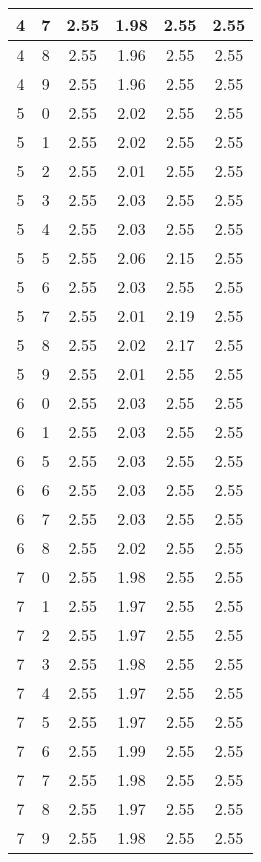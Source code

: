 \begin{longtable}{|c|c||c||c|c||c|}
	4 & 7 & 2.55 & 1.98 & 2.55 & 2.55 \\ \hline
	4 & 8 & 2.55 & 1.96 & 2.55 & 2.55 \\ \hline
	4 & 9 & 2.55 & 1.96 & 2.55 & 2.55 \\ \hline
	5 & 0 & 2.55 & 2.02 & 2.55 & 2.55 \\ \hline
	5 & 1 & 2.55 & 2.02 & 2.55 & 2.55 \\ \hline
	5 & 2 & 2.55 & 2.01 & 2.55 & 2.55 \\ \hline
	5 & 3 & 2.55 & 2.03 & 2.55 & 2.55 \\ \hline
	5 & 4 & 2.55 & 2.03 & 2.55 & 2.55 \\ \hline
	5 & 5 & 2.55 & 2.06 & 2.15 & 2.55 \\ \hline
	5 & 6 & 2.55 & 2.03 & 2.55 & 2.55 \\ \hline
	5 & 7 & 2.55 & 2.01 & 2.19 & 2.55 \\ \hline
	5 & 8 & 2.55 & 2.02 & 2.17 & 2.55 \\ \hline
	5 & 9 & 2.55 & 2.01 & 2.55 & 2.55 \\ \hline
	6 & 0 & 2.55 & 2.03 & 2.55 & 2.55 \\ \hline
	6 & 1 & 2.55 & 2.03 & 2.55 & 2.55 \\ \hline
	6 & 5 & 2.55 & 2.03 & 2.55 & 2.55 \\ \hline
	6 & 6 & 2.55 & 2.03 & 2.55 & 2.55 \\ \hline
	6 & 7 & 2.55 & 2.03 & 2.55 & 2.55 \\ \hline
	6 & 8 & 2.55 & 2.02 & 2.55 & 2.55 \\ \hline
	7 & 0 & 2.55 & 1.98 & 2.55 & 2.55 \\ \hline
	7 & 1 & 2.55 & 1.97 & 2.55 & 2.55 \\ \hline
	7 & 2 & 2.55 & 1.97 & 2.55 & 2.55 \\ \hline
	7 & 3 & 2.55 & 1.98 & 2.55 & 2.55 \\ \hline
	7 & 4 & 2.55 & 1.97 & 2.55 & 2.55 \\ \hline
	7 & 5 & 2.55 & 1.97 & 2.55 & 2.55 \\ \hline
	7 & 6 & 2.55 & 1.99 & 2.55 & 2.55 \\ \hline
	7 & 7 & 2.55 & 1.98 & 2.55 & 2.55 \\ \hline
	7 & 8 & 2.55 & 1.97 & 2.55 & 2.55 \\ \hline
	7 & 9 & 2.55 & 1.98 & 2.55 & 2.55 \\ \hline
\end{longtable}
\clearpage{}
